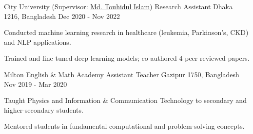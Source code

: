 \begin{cventries}
\cventry
  {City University (Supervisor: \href{https://www.linkedin.com/in/touhid000/}{Md. Touhidul Islam})} %
  {Research Assistant} %
  {Dhaka 1216, Bangladesh} %
  {Dec 2020 - Nov 2022} %
  {
    \begin{cvitems} %
      \item {Conducted machine learning research in healthcare (leukemia, Parkinson’s, CKD) and NLP applications.}
      \item{Trained and fine-tuned deep learning models; co-authored 4 peer-reviewed papers.}
    \end{cvitems}
  }
  



    
  \cventry
    {Milton English \& Math Academy} %
    {Assistant Teacher} %
    {Gazipur 1750, Bangladesh} %
    {Nov 2019 - Mar 2020} %
    {
      \begin{cvitems} %
        \item {Taught Physics and Information \& Communication Technology to secondary and higher-secondary students.}
        \item{Mentored students in fundamental computational and problem-solving concepts.}
      \end{cvitems}
    }

\end{cventries}
